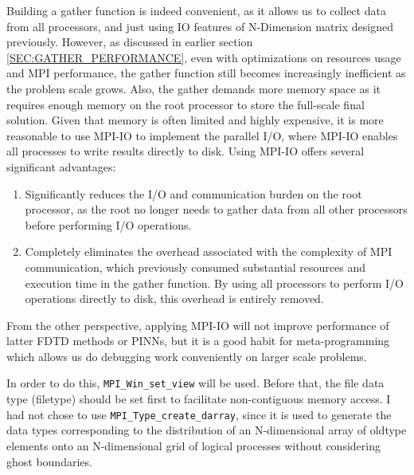 Building a gather function is indeed convenient, as it allows us to collect data from all processors, 
and just using IO features of N-Dimension matrix designed previously.
However, as discussed in earlier section \ref{SEC:GATHER_PERFORMANCE},
even with optimizations on resources usage and MPI performance, the gather function still becomes 
increasingly inefficient as the problem scale grows.
Also, the gather demands more memory space as it requires enough memory on the root processor to 
store the full-scale final solution.
Given that memory is often limited and highly expensive, it is more reasonable to use MPI-IO to implement the parallel I/O,
where MPI-IO enables all processes to write results directly to disk.
Using MPI-IO offers several significant advantages:
\begin{enumerate}
\item Significantly reduces the I/O and communication burden on the root processor, 
as the root no longer needs to gather data from all other processors before performing I/O operations.
\item Completely eliminates the overhead associated with the complexity of MPI communication, 
which previously consumed substantial resources and execution time in the gather function. 
By using all processors to perform I/O operations directly to disk, this overhead is entirely removed.
\end{enumerate}
From the other perspective, 
applying MPI-IO will not improve performance of latter FDTD methods or PINNs, 
but it is a good habit for meta-programming which allows us do debugging work conveniently on larger scale 
problems.

In order to do this, \texttt{MPI\_Win\_set\_view} will be used.
Before that, the file data type (filetype) should be set first to facilitate non-contiguous memory access.
I had not chose to use \texttt{MPI\_Type\_create\_darray}, since 
it is used to generate the data types corresponding to the distribution of an N-dimensional array 
of oldtype elements onto an N-dimensional grid of logical processes without considering ghost boundaries.

